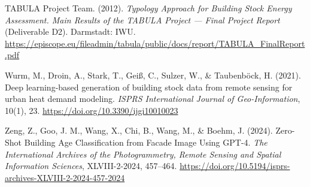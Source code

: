 \par\medskip
\noindent \hypertarget{ref:tabula2012}{}TABULA Project Team. (2012). \emph{Typology Approach for Building Stock Energy Assessment. Main Results of the TABULA Project --- Final Project Report} (Deliverable D2). Darmstadt: IWU. \url{https://episcope.eu/fileadmin/tabula/public/docs/report/TABULA_FinalReport.pdf}
\par\medskip
\noindent \hypertarget{ref:wurm2021}{}Wurm, M., Droin, A., Stark, T., Geiß, C., Sulzer, W., \& Taubenböck, H. (2021). Deep learning-based generation of building stock data from remote sensing for urban heat demand modeling. \emph{ISPRS International Journal of Geo-Information}, 10(1), 23. \url{https://doi.org/10.3390/ijgi10010023}
\par\medskip
\noindent \hypertarget{ref:zeng2024}{}Zeng, Z., Goo, J. M., Wang, X., Chi, B., Wang, M., \& Boehm, J. (2024). Zero-Shot Building Age Classification from Facade Image Using GPT-4. \emph{The International Archives of the Photogrammetry, Remote Sensing and Spatial Information Sciences}, XLVIII-2-2024, 457--464. \url{https://doi.org/10.5194/isprs-archives-XLVIII-2-2024-457-2024}
\par\medskip
\endgroup

